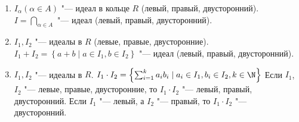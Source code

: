 \begin{enumerate}
\item
	$I_\alpha (\alpha \in A)$ "--- идеал в кольце $R$ (левый, правый, двусторонний).
	$I = \bigcap_{\alpha \in A}$ "--- идеал (левый, правый, двусторонний).

\item
	$I_1, I_2$ "--- идеалы в $R$ (левые, правые, двусторонние).
	$I_1 + I_2 = \left\{  a + b \mid a \in I_1, b \in I_2 \right\}$ "--- идеал (левый, правый, двусторонний).

\item
	$I_1, I_2$ "--- идеалы в $R$.
	$I_1 \cdot I_2 = \left\{ \sum_{i=1}^k a_i b_i \mid a_i \in I_1, b_i \in I_2, k \in \N \right\}$
	Если $I_1$, $I_2$ "--- левые, правые, двусторонние, то $I_1 \cdot I_2$ "--- левый, правый, двусторонний.
	Если $I_1$ "--- левый, а $I_2$ "--- правый, то $I_1 \cdot I_2$ "--- двусторонний.
\end{enumerate}

